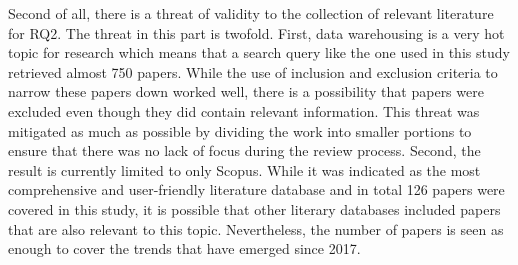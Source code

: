 \documentclass[11pt]{article}
\begin{document}
Second of all, there is a threat of validity to the collection of relevant literature for RQ2. The threat in this part is twofold. First, data warehousing is a very hot topic for research which means that a search query like the one used in this study retrieved almost 750 papers. While the use of inclusion and exclusion criteria to narrow these papers down worked well, there is a possibility that papers were excluded even though they did contain relevant information. This threat was mitigated as much as possible by dividing the work into smaller portions to ensure that there was no lack of focus during the review process. Second, the result is currently limited to only Scopus. While it was indicated as the most comprehensive and user-friendly literature database \cite{harzing2016google, mongeon2016journal} and in total 126 papers were covered in this study, it is possible that other literary databases included papers that are also relevant to this topic. Nevertheless, the number of papers is seen as enough to cover the trends that have emerged since 2017.

\printbibliography
\onecolumn
\appendix
\end{document}
